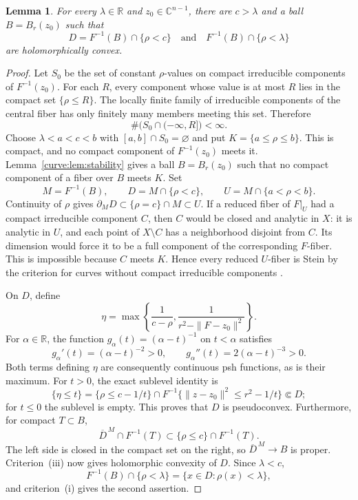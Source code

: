\documentclass[11pt]{amsart}
\newtheorem{lemma}[theorem]{Lemma}
\theoremstyle{definition}
\theoremstyle{remark}
\numberwithin{equation}{section}
\newcommand{\C}{\mathbb C}
\newcommand{\R}{\mathbb R}
\begin{document}
\begin{lemma}\label{curve:lem:neighborhood}
For every $\lambda\in\R$ and $z_0\in\C^{n-1}$, there are $c>\lambda$
and a ball $B=B_r(z_0)$ such that
\[
 D=F^{-1}(B)\cap\{\rho<c\}
 \quad\text{and}\quad
 F^{-1}(B)\cap\{\rho<\lambda\}
\]
are holomorphically convex.
\end{lemma}
\begin{proof}
Let $S_0$ be the set of constant $\rho$-values on compact irreducible
components of $F^{-1}(z_0)$. For each $R$, every component whose
value is at most $R$ lies in the compact set $\{\rho\le R\}$.
The locally finite family of irreducible components of the central
fiber has only finitely many members meeting this set. Therefore
\[
 \#\bigl(S_0\cap(-\infty,R]\bigr)<\infty.
\]
Choose $\lambda<a<c<b$ with $[a,b]\cap S_0=\varnothing$ and put
$K=\{a\le\rho\le b\}$. This is compact, and no compact component
of $F^{-1}(z_0)$ meets it. Lemma~\ref{curve:lem:stability} gives a
ball $B=B_r(z_0)$ such that no compact component of a fiber over
$B$ meets $K$. Set
\[
 M=F^{-1}(B),\qquad D=M\cap\{\rho<c\},\qquad
 U=M\cap\{a<\rho<b\}.
\]
Continuity of $\rho$ gives
$\partial_M D\subset\{\rho=c\}\cap M\subset U$.
If a reduced fiber of $F|_U$ had a compact irreducible component $C$,
then $C$ would be closed and analytic in $X$: it is analytic in $U$,
and each point of $X\setminus C$ has a neighborhood disjoint from $C$.
Its dimension would force it to be a full component of the
corresponding $F$-fiber. This is impossible because $C$ meets $K$.
Hence every reduced $U$-fiber is Stein by the criterion for curves
without compact irreducible components
\cite[\S3, p.~1663]{Vajaitu2022}.

On $D$, define
\[
 \eta=\max\left\{\frac1{c-\rho},
                  \frac1{r^2-\|F-z_0\|^2}\right\}.
\]
For $\alpha\in\R$, the function $g_\alpha(t)=(\alpha-t)^{-1}$
on $t<\alpha$ satisfies
\[
 g_\alpha'(t)=(\alpha-t)^{-2}>0,\qquad
 g_\alpha''(t)=2(\alpha-t)^{-3}>0.
\]
Both terms defining $\eta$ are consequently continuous psh functions,
as is their maximum. For $t>0$, the exact sublevel identity is
\[
 \{\eta\le t\}
 =\{\rho\le c-1/t\}\cap
 F^{-1}\{\|z-z_0\|^2\le r^2-1/t\}\Subset D;
\]
for $t\le0$ the sublevel is empty. This proves that $D$ is
pseudoconvex. Furthermore, for compact $T\subset B$,
\[
 \overline D^{\,M}\cap F^{-1}(T)
 \subset\{\rho\le c\}\cap F^{-1}(T).
\]
The left side is closed in the compact set on the right, so
$\overline D^{\,M}\to B$ is proper. Criterion~\textup{(iii)} now
gives holomorphic convexity of $D$. Since $\lambda<c$,
\[
 F^{-1}(B)\cap\{\rho<\lambda\}
 =\{x\in D:\rho(x)<\lambda\},
\]
and criterion~\textup{(i)} gives the second assertion.
\end{proof}
\end{document}
